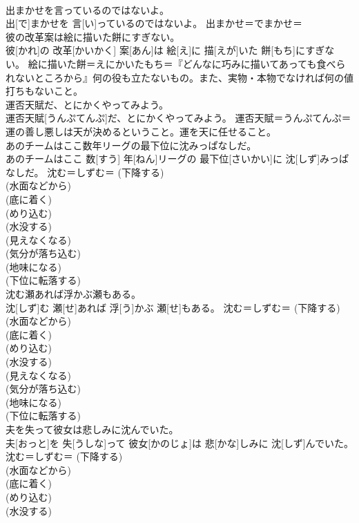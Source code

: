 \documentclass[8pt]{extreport}
\begin{document}
\begin{CJK}{UTF8}{min}
{\\	出まかせを言っているのではないよ。	
\\	出[で]まかせを 言[い]っているのではないよ。	出まかせ＝でまかせ＝ 
\\	彼の改革案は絵に描いた餅にすぎない。	
\\	彼[かれ]の 改革[かいかく] 案[あん]は 絵[え]に 描[えが]いた 餅[もち]にすぎない。	絵に描いた餅＝えにかいたもち＝『どんなに巧みに描いてあっても食べられないところから』何の役も立たないもの。また、実物・本物でなければ何の値打ちもないこと。
\\	運否天賦だ、とにかくやってみよう。	
\\	運否天賦[うんぷてんぷ]だ、とにかくやってみよう。	運否天賦＝うんぷてんぷ＝運の善し悪しは天が決めるということ。運を天に任せること。
\\	あのチームはここ数年リーグの最下位に沈みっぱなしだ。	
\\	あのチームはここ 数[すう] 年[ねん]リーグの 最下位[さいかい]に 沈[しず]みっぱなしだ。	沈む＝しずむ＝ (下降する) 
\\	(水面などから) 
\\	(底に着く) 
\\	(めり込む) 
\\	(水没する) 
\\	(見えなくなる) 
\\	(気分が落ち込む) 
\\	(地味になる) 
\\	(下位に転落する) 
\\	沈む瀬あれば浮かぶ瀬もある。	
\\	沈[しず]む 瀬[せ]あれば 浮[う]かぶ 瀬[せ]もある。	沈む＝しずむ＝ (下降する) 
\\	(水面などから) 
\\	(底に着く) 
\\	(めり込む) 
\\	(水没する) 
\\	(見えなくなる) 
\\	(気分が落ち込む) 
\\	(地味になる) 
\\	(下位に転落する) 
\\	夫を失って彼女は悲しみに沈んでいた。	
\\	夫[おっと]を 失[うしな]って 彼女[かのじょ]は 悲[かな]しみに 沈[しず]んでいた。	沈む＝しずむ＝ (下降する) 
\\	(水面などから) 
\\	(底に着く) 
\\	(めり込む) 
\\	(水没する) 
}
\end{CJK}
\end{document}
